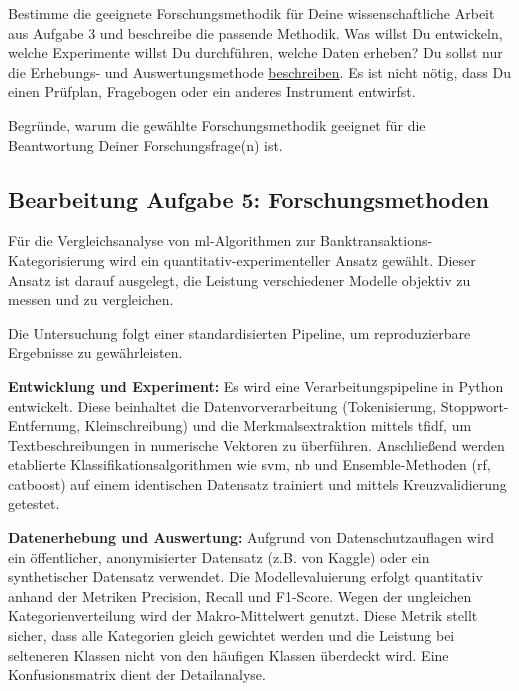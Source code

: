 
\begin{enumerate}[leftmargin=*]
	\itshape{
	\item Bestimme die geeignete Forschungsmethodik für Deine wissenschaftliche Arbeit aus Aufgabe 3 und
	      beschreibe die passende Methodik. Was willst Du entwickeln, welche Experimente willst Du durchführen,
	      welche Daten erheben? Du sollst nur die Erhebungs- und Auswertungsmethode \uline{beschreiben}. Es ist nicht
	      nötig, dass Du einen Prüfplan, Fragebogen oder ein anderes Instrument entwirfst.
	\item Begründe, warum die gewählte Forschungsmethodik geeignet für die Beantwortung Deiner
	      Forschungsfrage(n) ist.
	      }
\end{enumerate}

\clearpage

\subsection*{Bearbeitung Aufgabe 5: Forschungsmethoden}

Für die Vergleichsanalyse von \acrlong{ml}-Algorithmen zur Banktransaktions-Kategorisierung wird ein quantitativ-experimenteller Ansatz gewählt. Dieser Ansatz ist darauf ausgelegt, die Leistung verschiedener Modelle objektiv zu messen und zu vergleichen.

Die Untersuchung folgt einer standardisierten Pipeline, um reproduzierbare Ergebnisse zu gewährleisten.

\textbf{Entwicklung und Experiment:}
Es wird eine Verarbeitungspipeline in Python entwickelt. Diese beinhaltet die Datenvorverarbeitung (Tokenisierung, Stoppwort-Entfernung, Kleinschreibung) und die Merkmalsextraktion mittels \gls{tfidf}, um Textbeschreibungen in numerische Vektoren zu überführen. Anschließend werden etablierte Klassifikationsalgorithmen wie \gls{svm}, \gls{nb} und Ensemble-Methoden (\gls{rf}, \gls{catboost}) auf einem identischen Datensatz trainiert und mittels Kreuzvalidierung getestet.

\textbf{Datenerhebung und Auswertung:}
Aufgrund von Datenschutzauflagen wird ein öffentlicher, anonymisierter Datensatz (z.B. von Kaggle) oder ein synthetischer Datensatz verwendet. Die Modellevaluierung erfolgt quantitativ anhand der Metriken Precision, Recall und F1-Score. Wegen der ungleichen Kategorienverteilung wird der Makro-Mittelwert genutzt. Diese Metrik stellt sicher, dass alle Kategorien gleich gewichtet werden und die Leistung bei selteneren Klassen nicht von den häufigen Klassen überdeckt wird. Eine Konfusionsmatrix dient der Detailanalyse.

